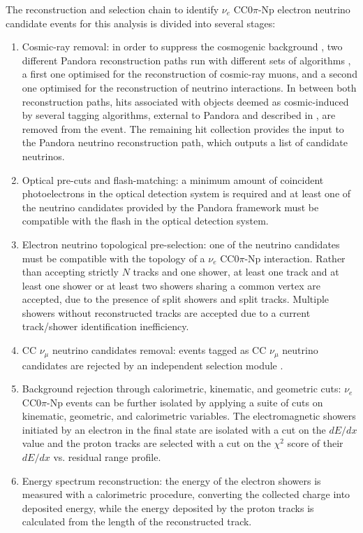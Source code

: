 The reconstruction and selection chain to identify $\nu_{e}$ CC0$\pi$-Np electron neutrino candidate events for this analysis is divided into several stages:
\begin{enumerate}

\item Cosmic-ray removal:  in order to suppress the cosmogenic background \cite{cosmic, mucs}, two different Pandora reconstruction paths run with different sets of algorithms \cite{pandora}, a first one optimised for the reconstruction of cosmic-ray muons, and a second one optimised for the reconstruction of neutrino interactions. In between both reconstruction paths, hits associated with objects deemed as cosmic-induced by several tagging algorithms, external to Pandora and described in \cite{ubxsec}, are removed from the event. The remaining hit collection provides the input to the Pandora neutrino reconstruction path, which outputs a list of candidate neutrinos.

\item Optical pre-cuts and flash-matching: a minimum amount of coincident photoelectrons in the optical detection system is required and at least one of the neutrino candidates provided by the Pandora framework must be compatible with the flash in the optical detection system.
\item Electron neutrino topological pre-selection: one of the neutrino candidates must be compatible with the topology of a $\nu_{e}$ CC0$\pi$-Np interaction. Rather than accepting strictly $N$ tracks and one shower, at least one track and at least one shower or at least two showers sharing a common vertex are accepted, due to the presence of split showers and split tracks. Multiple showers without reconstructed tracks are accepted due to a current track/shower identification inefficiency.

\item CC $\nu_{\mu}$ neutrino candidates removal: events tagged as CC $\nu_{\mu}$ neutrino candidates are rejected by an independent selection module \cite{ubxsec}. 
\item Background rejection through calorimetric, kinematic, and geometric cuts: $\nu_{e}$ CC0$\pi$-Np events can be further isolated by applying a suite of cuts on kinematic, geometric, and calorimetric variables. The electromagnetic showers initiated by an electron in the final state are isolated with a cut on the $dE/dx$ value and the proton tracks are selected with a cut on the $\chi^{2}$ score of their $dE/dx$ vs. residual range profile.
\item Energy spectrum reconstruction: the energy of the electron showers is measured with a calorimetric procedure, converting the collected charge into deposited energy, while the energy deposited by the proton tracks is calculated from the length of the reconstructed track. 
\end{enumerate}


